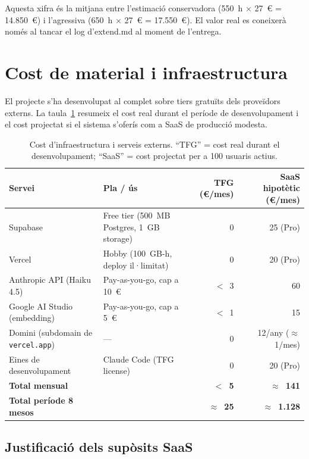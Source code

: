 Aquesta xifra és la mitjana entre l'estimació conservadora (550~h $\times$ 27~\euro{} = 14.850~\euro{}) i l'agressiva (650~h $\times$ 27~\euro{} = 17.550~\euro{}). El valor real es coneixerà només al tancar el log d'extend.md al moment de l'entrega.

\section{Cost de material i infraestructura}
\label{sec:cost-material}

El projecte s'ha desenvolupat al complet sobre tiers gratuïts dels proveïdors externs. La taula~\ref{tab:cost-infraestructura} resumeix el cost real durant el període de desenvolupament i el cost projectat si el sistema s'oferís com a SaaS de producció modesta.

\begin{table}[H]
    \centerfloat
    \footnotesize
    \caption{Cost d'infraestructura i serveis externs. ``TFG'' = cost real durant el desenvolupament; ``SaaS'' = cost projectat per a 100 usuaris actius.}
    \label{tab:cost-infraestructura}
    \begin{tabular}{@{}l>{\raggedright\arraybackslash}p{4cm}rr@{}}
        \toprule
        Servei & Pla / ús & TFG (\euro{}/mes) & SaaS hipotètic (\euro{}/mes) \\
        \midrule
        Supabase & Free tier (500~MB Postgres, 1~GB storage) & 0 & 25 (Pro) \\
        Vercel & Hobby (100~GB-h, deploy il·limitat) & 0 & 20 (Pro) \\
        Anthropic API (Haiku 4.5) & Pay-as-you-go, cap a 10~\euro{} & $<$~3 & 60 \\
        Google AI Studio (embedding) & Pay-as-you-go, cap a 5~\euro{} & $<$~1 & 15 \\
        Domini (subdomain de \texttt{vercel.app}) & --- & 0 & 12/any ($\approx$~1/mes) \\
        Eines de desenvolupament & Claude Code (TFG license) & 0 & 20 (Pro) \\
        \midrule
        \textbf{Total mensual} & & \textbf{$<$~5} & \textbf{$\approx$~141} \\
        \textbf{Total període 8 mesos} & & \textbf{$\approx$~25} & \textbf{$\approx$~1.128} \\
        \bottomrule
    \end{tabular}
\end{table}

\subsection{Justificació dels supòsits SaaS}

